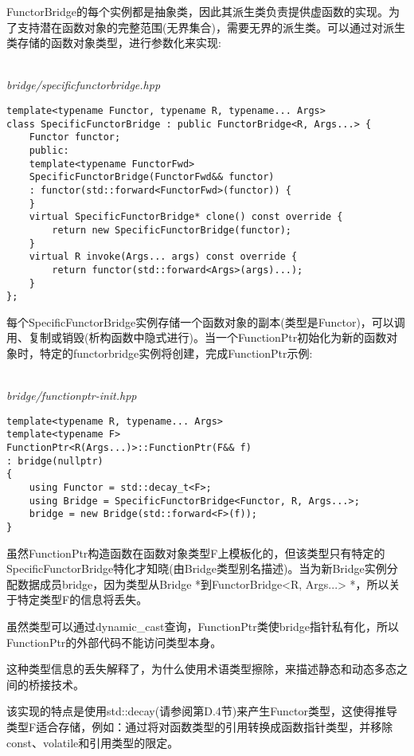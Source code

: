 FunctorBridge的每个实例都是抽象类，因此其派生类负责提供虚函数的实现。为了支持潜在函数对象的完整范围(无界集合)，需要无界的派生类。可以通过对派生类存储的函数对象类型，进行参数化来实现:

\hspace*{\fill} \\ %
\noindent
\textit{bridge/specificfunctorbridge.hpp}
\begin{lstlisting}[style=styleCXX]
template<typename Functor, typename R, typename... Args>
class SpecificFunctorBridge : public FunctorBridge<R, Args...> {
	Functor functor;
	public:
	template<typename FunctorFwd>
	SpecificFunctorBridge(FunctorFwd&& functor)
	: functor(std::forward<FunctorFwd>(functor)) {
	}
	virtual SpecificFunctorBridge* clone() const override {
		return new SpecificFunctorBridge(functor);
	}
	virtual R invoke(Args... args) const override {
		return functor(std::forward<Args>(args)...);
	}
};
\end{lstlisting}

每个SpecificFunctorBridge实例存储一个函数对象的副本(类型是Functor)，可以调用、复制或销毁(析构函数中隐式进行)。当一个FunctionPtr初始化为新的函数对象时，特定的functorbridge实例将创建，完成FunctionPtr示例:

\hspace*{\fill} \\ %
\noindent
\textit{bridge/functionptr-init.hpp}
\begin{lstlisting}[style=styleCXX]
template<typename R, typename... Args>
template<typename F>
FunctionPtr<R(Args...)>::FunctionPtr(F&& f)
: bridge(nullptr)
{
	using Functor = std::decay_t<F>;
	using Bridge = SpecificFunctorBridge<Functor, R, Args...>;
	bridge = new Bridge(std::forward<F>(f));
}
\end{lstlisting}

虽然FunctionPtr构造函数在函数对象类型F上模板化的，但该类型只有特定的SpecificFunctorBridge特化才知晓(由Bridge类型别名描述)。当为新Bridge实例分配数据成员bridge，因为类型从Bridge *到FunctorBridge<R, Args...> *，所以关于特定类型F的信息将丢失。

\begin{tcolorbox}[colback=webgreen!5!white,colframe=webgreen!75!black]
\hspace*{0.75cm}虽然类型可以通过dynamic\_cast查询，FunctionPtr类使bridge指针私有化，所以FunctionPtr的外部代码不能访问类型本身。
\end{tcolorbox}

这种类型信息的丢失解释了，为什么使用术语类型擦除，来描述静态和动态多态之间的桥接技术。

该实现的特点是使用std::decay(请参阅第D.4节)来产生Functor类型，这使得推导类型F适合存储，例如：通过将对函数类型的引用转换成函数指针类型，并移除const、volatile和引用类型的限定。







































